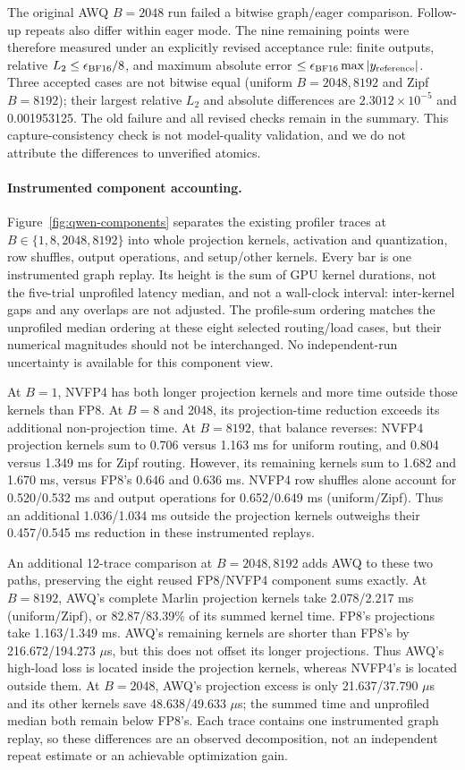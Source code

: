 \documentclass[10pt,twocolumn]{article}
\begin{document}
The original AWQ $B=2048$ run failed a bitwise graph/eager comparison.
Follow-up repeats also differ within eager mode. The nine remaining points
were therefore measured under an explicitly revised acceptance rule:
finite outputs, relative $L_2\leq\epsilon_{\rm BF16}/8$, and maximum
absolute error $\leq\epsilon_{\rm BF16}\max|y_{\rm reference}|$.
Three accepted cases are not bitwise equal (uniform $B=2048,8192$ and Zipf
$B=8192$); their largest relative $L_2$ and absolute differences are
$2.3012\times10^{-5}$ and 0.001953125. The old failure and all revised checks
remain in the summary. This capture-consistency check is not model-quality
validation, and we do not attribute the differences to unverified atomics.

\paragraph{Instrumented component accounting.}
Figure~\ref{fig:qwen-components} separates the existing profiler traces at
$B\in\{1,8,2048,8192\}$ into whole projection kernels, activation and
quantization, row shuffles, output operations, and setup/other kernels.
Every bar is one instrumented graph replay. Its height is the sum of GPU
kernel durations, not the five-trial unprofiled latency median, and not a
wall-clock interval: inter-kernel gaps and any overlaps are not adjusted.
The profile-sum ordering matches the unprofiled median ordering at these
eight selected routing/load cases, but their numerical magnitudes should
not be interchanged. No independent-run uncertainty is available for this
component view.

At $B=1$, NVFP4 has both longer projection kernels and more time outside
those kernels than FP8. At $B=8$ and 2048, its projection-time reduction
exceeds its additional non-projection time. At $B=8192$, that balance
reverses: NVFP4 projection kernels sum to 0.706 versus 1.163 ms for uniform
routing, and 0.804 versus 1.349 ms for Zipf routing. However, its remaining
kernels sum to 1.682 and 1.670 ms, versus FP8's 0.646 and 0.636 ms.
NVFP4 row shuffles alone account for 0.520/0.532 ms and output operations
for 0.652/0.649 ms (uniform/Zipf). Thus an additional 1.036/1.034 ms outside
the projection kernels outweighs their 0.457/0.545 ms reduction in these
instrumented replays.

An additional 12-trace comparison at $B=2048,8192$ adds AWQ to these
two paths, preserving the eight reused FP8/NVFP4 component sums exactly.
At $B=8192$, AWQ's complete Marlin projection kernels take 2.078/2.217 ms
(uniform/Zipf), or 82.87/83.39\% of its summed kernel time. FP8's projections
take 1.163/1.349 ms. AWQ's remaining kernels are shorter than FP8's by
216.672/194.273 $\mu$s, but this does not offset its longer projections.
Thus AWQ's high-load loss is located inside the projection kernels,
whereas NVFP4's is located outside them. At $B=2048$, AWQ's projection
excess is only 21.637/37.790 $\mu$s and its other kernels save
48.638/49.633 $\mu$s; the summed time and unprofiled median both remain
below FP8's. Each trace contains one instrumented graph replay, so these
differences are an observed decomposition, not an independent repeat
estimate or an achievable optimization gain.
\end{document}
